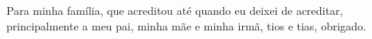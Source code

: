 \begin{agradecimentos}
Para minha família, que acreditou até quando eu deixei de acreditar, principalmente
a meu pai, minha mãe e minha irmã, tios e tias, obrigado.

\end{agradecimentos}
